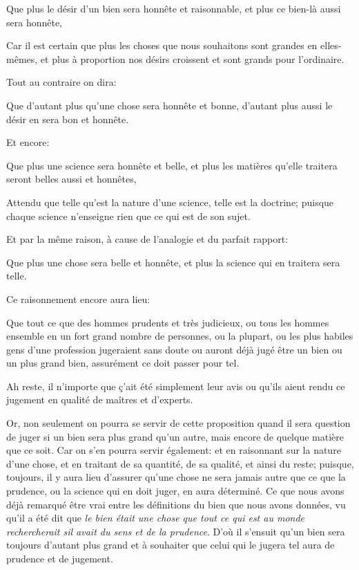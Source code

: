 \begin{lieu}
	Que plus le désir d'un bien sera honnête et raisonnable, et plus ce bien-là aussi sera honnête,
\end{lieu}

Car il est certain que plus les choses que nous souhaitons sont grandes en elles-mêmes, et plus à proportion nos désirs
croissent et sont grands pour l'ordinaire.

\bigbreak

Tout au contraire on dira:

\begin{lieu}
	Que d'autant plus qu'une chose sera honnête et bonne, d'autant plus aussi le désir en sera bon et honnête.
\end{lieu}

Et encore:

\begin{lieu}
	Que plus une science sera honnête et belle, et plus les matières qu'elle traitera seront belles aussi et honnêtes,
\end{lieu}

Attendu que telle qu'est la nature d'une science, telle est la doctrine; puisque chaque science n'enseigne rien que ce qui
est de son sujet.

Et par la même raison, à cause de l'analogie et du parfait rapport:

\begin{lieu}
	Que plus une chose sera belle et honnête, et plus la science qui en traitera sera telle.
\end{lieu}

\bigbreak

Ce raisonnement encore aura lieu:

\begin{lieu}
	Que tout ce que des hommes prudents et très judicieux, ou tous les hommes ensemble en un fort grand nombre de personnes,
	ou la plupart, ou les plus habiles gens d'une profession jugeraient sans doute ou auront déjà jugé être un bien ou un plus
	grand bien, assurément ce doit passer pour tel.
\end{lieu}

Ah reste, il n'importe que ç'ait été simplement leur avis ou qu'ils aient rendu ce jugement en qualité de maîtres et d'experts.

Or, non seulement on pourra se servir de cette proposition quand il sera question de juger si un bien sera plus grand qu'un autre,
mais encore de quelque matière que ce soit. Car on s'en pourra servir également: et en raisonnant sur la nature d'une chose, et en
traitant de sa quantité, de sa qualité, et ainsi du reste; puisque, toujours, il y aura lieu d’assurer qu'une chose ne sera jamais
autre que ce que la prudence, ou la science qui en doit juger, en aura déterminé. Ce que nous avons déjà remarqué être vrai entre
les définitions du bien que nous avons données, vu qu'il a été dit que \emph{le bien était une chose que tout ce qui est au monde
rechercherait sil avait du sens et de la prudence}. D'où il s'ensuit qu'un bien sera toujours d'autant plus grand et à souhaiter
que celui qui le jugera tel aura de prudence et de jugement.

